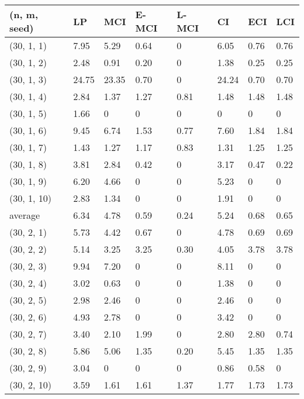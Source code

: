 \begin{appendices}
\begin{table}[H]
\centering
\begin{tabular}{  p{1.6cm} | p{0.8cm} | p{1cm} p{1cm} p{1cm} | p{1cm} p{1cm} p{1cm} }
\hline
(n, m, seed) & LP   & MCI & E-MCI & L-MCI &  CI & ECI & LCI \\ 
\midrule
(30, 1, 1) & 7.95   &  5.29 & 0.64  &0   &  6.05 &  0.76 &  0.76 \\
(30, 1, 2) &  2.48  &  0.91 & 0.20  &  0 & 1.38  &  0.25 & 0.25  \\
(30, 1, 3) &  24.75  & 23.35  & 0.70  & 0  &  24.24 & 0.70  &  0.70 \\
(30, 1, 4) &  2.84  & 1.37  & 1.27  & 0.81  &  1.48 & 1.48  &  1.48 \\
(30, 1, 5) & 1.66   & 0  & 0   & 0  & 0  &  0 & 0 \\
(30, 1, 6) &   9.45 &  6.74 & 1.53  & 0.77  & 7.60  &  1.84 &   1.84 \\
(30, 1, 7) &1.43    & 1.27  & 1.17  & 0.83  &  1.31 &  1.25 &  1.25 \\
(30, 1, 8) &3.81    &  2.84 & 0.42  & 0  & 3.17  & 0.47  &  0.22 \\
(30, 1, 9) &  6.20  & 4.66  & 0  & 0  &  5.23 &  0 &  0 \\
(30, 1, 10) &  2.83  &  1.34 & 0  &  0 & 1.91  &  0 &  0 \\
\midrule
average & 6.34  & 4.78 & 0.59  &0.24  &  5.24 & 0.68  & 0.65 \\
\bottomrule
(30, 2, 1) & 5.73  & 4.42  &  0.67 &0  &  4.78 & 0.69  & 0.69 \\
(30, 2, 2) & 5.14  &  3.25 & 3.25  & 0.30  &  4.05 & 3.78  & 3.78 \\
(30, 2, 3) & 9.94  &7.20   & 0  & 0 & 8.11  &  0 & 0  \\
(30, 2, 4) &  3.02 & 0.63  & 0  & 0 &  1.38 &0  &  0 \\
(30, 2, 5) & 2.98  & 2.46  &0   & 0  & 2.46  &  0 & 0 \\
(30, 2, 6) & 4.93  & 2.78  & 0  & 0 & 3.42  & 0  & 0 \\
(30, 2, 7) &  3.40 & 2.10  & 1.99  &0  &  2.80 & 2.80  & 0.74  \\
(30, 2, 8) & 5.86  & 5.06  & 1.35  & 0.20 &  5.45 & 1.35 & 1.35 \\
(30, 2, 9) &  3.04 &  0 &  0 &0  &  0.86 &  0.58 & 0  \\
(30, 2, 10) & 3.59  &  1.61 & 1.61  & 1.37 & 1.77  & 1.73  & 1.73 \\

\end{tabular}
\end{table}
\end{appendices}
